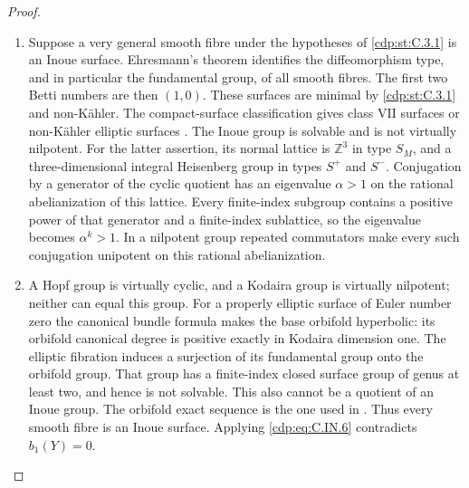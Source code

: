 \begin{proof}
\begin{enumerate}[leftmargin=*]
\item Suppose a very general smooth fibre under the hypotheses of
\ref{cdp:st:C.3.1} is an Inoue surface. Ehresmann's
theorem identifies the diffeomorphism type, and in particular
the fundamental group, of all smooth fibres. The first two
Betti numbers are then $(1,0)$. These surfaces are minimal by
\ref{cdp:st:C.3.1} and non-K\"ahler. The compact-surface classification
gives class VII surfaces or non-K\"ahler elliptic surfaces
\cite[Theorem 3.2]{BMS2012}.
The Inoue group is solvable and is not virtually nilpotent.
For the latter assertion, its normal lattice is $\mathbb Z^3$
in type $S_M$, and a three-dimensional integral Heisenberg group
in types $S^{+}$ and $S^{-}$. Conjugation by a generator of the
cyclic quotient has an eigenvalue $\alpha>1$ on the rational
abelianization of this lattice. Every finite-index subgroup
contains a positive power of that generator and a finite-index
sublattice, so the eigenvalue becomes $\alpha^k>1$. In a
nilpotent group repeated commutators make every such conjugation
unipotent on this rational abelianization. 
\item A Hopf group is virtually cyclic, and a Kodaira group is virtually
nilpotent; neither can equal this group. For a properly elliptic
surface of Euler number zero the canonical bundle formula makes
the base orbifold hyperbolic: its orbifold canonical degree is
positive exactly in Kodaira dimension one. The elliptic
fibration induces a surjection of its fundamental group onto the
orbifold group. That group has a finite-index closed surface
group of genus at least two, and hence is not solvable. This
also cannot be a quotient of an Inoue group. The orbifold exact
sequence is the one used in \cite[Section 3.3]{BMS2012}.
Thus every smooth fibre is an Inoue surface. Applying \eqref{cdp:eq:C.IN.6}
contradicts $b_1(Y)=0$.

\end{enumerate}
\end{proof}